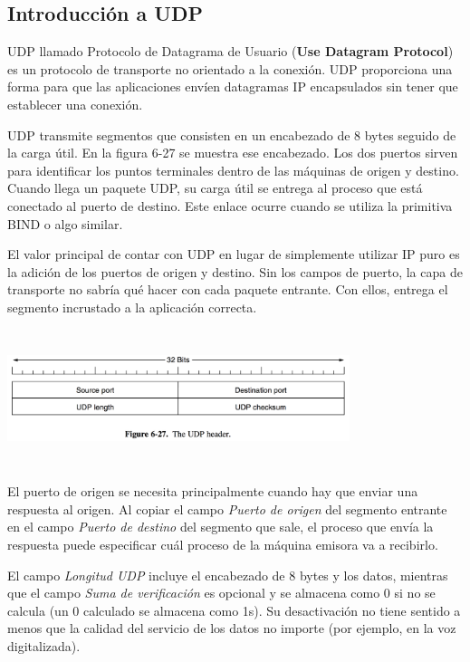 \documentclass[10pt,a4paper]{report}
\begin{document}
\subsection{Introducción a UDP}

	\par UDP llamado Protocolo de Datagrama de Usuario (\textbf{Use Datagram Protocol}) es un protocolo de transporte no orientado a la conexión. UDP proporciona una forma para que las aplicaciones envíen datagramas IP encapsulados sin tener que establecer una conexión.
	
	\par UDP transmite segmentos que consisten en un encabezado de 8 bytes seguido de la carga útil. En la figura 6-27 se muestra ese encabezado. Los dos puertos sirven para identificar los puntos terminales dentro de las máquinas de origen y destino. Cuando llega un paquete UDP, su carga útil se entrega al proceso que está conectado al puerto de destino. Este enlace ocurre cuando se utiliza la primitiva BIND o algo similar.
	
	\par El valor principal de contar con UDP en lugar de simplemente utilizar IP puro es la adición de los puertos de origen y destino. Sin los campos de puerto, la capa de transporte no sabría qué hacer con cada paquete entrante. Con ellos, entrega el segmento incrustado a la aplicación correcta.
	
	\begin{center}
		\includegraphics[width=10cm, height=4cm]{./imagenes/udp.png} 
	\end{center}
	
	\par El puerto de origen se necesita principalmente cuando hay que enviar una respuesta al origen. Al copiar el campo \textit{Puerto de origen} del segmento entrante en el campo \textit{Puerto de destino} del segmento que sale, el proceso que envía la respuesta puede especificar cuál proceso de la máquina emisora va a recibirlo.

	\par El campo \textit{Longitud UDP} incluye el encabezado de 8 bytes y los datos, mientras que el campo \textit{Suma de verificación} es opcional y se almacena como 0 si no se calcula (un 0 calculado se almacena como 1s). Su desactivación no tiene sentido a menos que la calidad del servicio de los datos no importe (por ejemplo, en la voz digitalizada).
	
\end{document}
